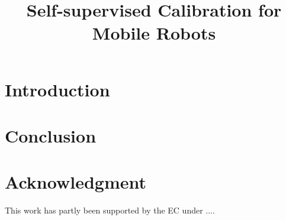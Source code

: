 \documentclass[letterpaper, 10 pt, conference]{sty/ieeeconf}
\begin{document}
\title{\LARGE \bf
Self-supervised Calibration for Mobile Robots
}

\author{
}

\maketitle

\begin{abstract}

\end{abstract}

\section{Introduction}


\section{Conclusion\label{sec:conc}}


\section*{Acknowledgment}
This work has partly been supported by the EC under ....



\end{document}
